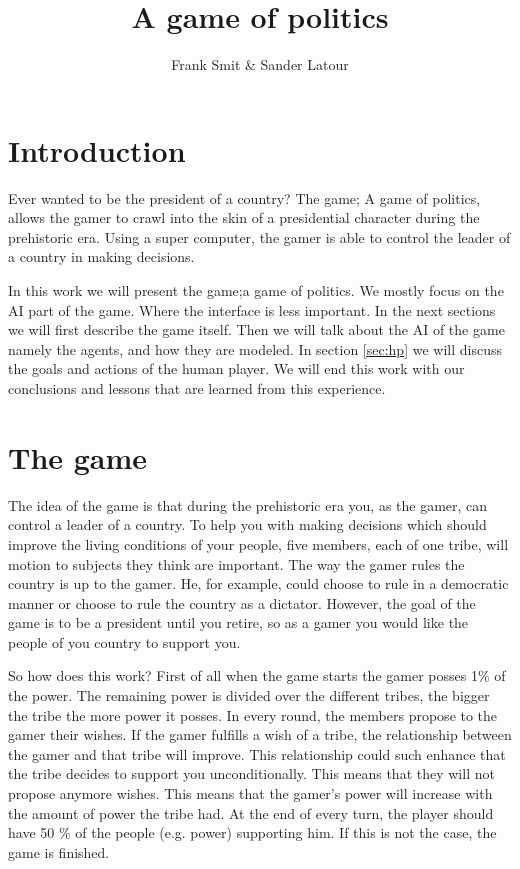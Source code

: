 \documentclass[11pt,a4paper]{article}
\author{Frank Smit \& Sander Latour}
\title{A game of politics}
\begin{document}
\maketitle

\section{Introduction}
Ever wanted to be the president of a country? The game; A game of politics, allows the gamer to crawl into the skin of a presidential character during the prehistoric era. Using a super computer, the gamer is able to control the leader of a country in making decisions. 

In this work we will present the game;a game of politics. We mostly focus on the AI part of the game. Where the interface is less important. In the next sections we will first describe the game itself. Then we will talk about the AI of the game namely the agents, and how they are modeled. In section \ref{sec:hp} we will discuss the goals and actions of the human player. We will end this work with our conclusions and lessons that are learned from this experience. 

\section{The game}
\label{sec:tg}
The idea of the game is that during the prehistoric era you, as the gamer, can control a leader of a country. To help you with making decisions which should improve the living conditions of your people, five members, each of one tribe, will motion to subjects they think are important. The way the gamer rules the country is up to the gamer. He, for example, could choose to rule in a democratic manner or choose to rule the country as a dictator. However, the goal of the game is to be a president until you retire, so as a gamer you would like the people of you country to support you.

So how does this work? First of all when the game starts the gamer posses 1\% of the power. The remaining power is divided over the different tribes, the bigger the tribe the more power it posses. In every round, the members propose to the gamer their wishes. If the gamer fulfills a wish of a tribe, the relationship between the gamer and that tribe will improve. This relationship could such enhance that the tribe decides to support you unconditionally. This means that they will not propose anymore wishes. This means that the gamer's power will increase with the amount of power the tribe had. At the end of every turn, the player should have 50 \% of the people (e.g. power) supporting him. If this is not the case, the game is finished. 
\end{document}
